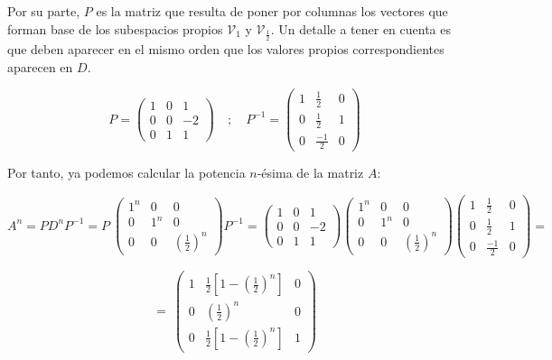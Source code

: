 \begin{nlist}
Por su parte, $P$ es la matriz que resulta de poner por columnas los vectores que forman base de los subespacios propios $\mathcal V_1$ y $\mathcal V_{\frac{1}{2}}$. Un detalle a tener en cuenta es que deben aparecer en el mismo orden que los valores propios correspondientes aparecen en $D$.

$$P =
\begin{pmatrix}
  1 & 0 & 1 \\
  0 & 0 & -2 \\
  0 & 1 & 1
\end{pmatrix} \quad ; \quad P^{-1} =
\begin{pmatrix}
  1 & \frac{1}{2} & 0 \\
  0 & \frac{1}{2} & 1 \\
  0 & \frac{-1}{2} & 0
\end{pmatrix}$$
\end{nlist}

Por tanto, ya podemos calcular la potencia $n$-ésima de la matriz $A$:

$$A^n = PD^nP^{-1} = P \
\begin{pmatrix}
  1^n & 0 & 0 \\
  0 & 1^n & 0 \\
  0 & 0 & \left(\frac{1}{2}\right)^n
\end{pmatrix} P^{-1} =
\begin{pmatrix}
  1 & 0 & 1 \\
  0 & 0 & -2 \\
  0 & 1 & 1
\end{pmatrix} \begin{pmatrix}
  1^n & 0 & 0 \\
  0 & 1^n & 0 \\
  0 & 0 & \left(\frac{1}{2}\right)^n
\end{pmatrix} \begin{pmatrix}
  1 & \frac{1}{2} & 0 \\
  0 & \frac{1}{2} & 1 \\
  0 & \frac{-1}{2} & 0
\end{pmatrix} = $$

$$= \
\begin{pmatrix}
  1 & \frac{1}{2} \left[1 -\left(\frac{1}{2}\right)^n \right] & 0 \\
  0 & \left( \frac{1}{2} \right)^n & 0 \\
  0 & \frac{1}{2} \left[1 -\left(\frac{1}{2}\right)^n \right] & 1
\end{pmatrix}$$


